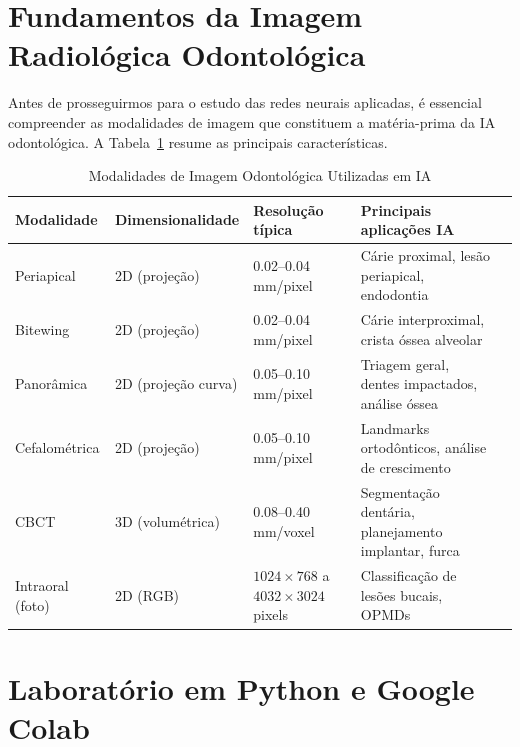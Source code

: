 \section{Fundamentos da Imagem Radiológica Odontológica}

Antes de prosseguirmos para o estudo das redes neurais aplicadas, é essencial compreender as modalidades de imagem que constituem a matéria-prima da IA odontológica. A Tabela~\ref{tab:modalidades-imagem} resume as principais características.

\begin{table}[H]
  \centering
  \caption{Modalidades de Imagem Odontológica Utilizadas em IA}
  \label{tab:modalidades-imagem}
  \begin{tabularx}{\textwidth}{lXXXX}
    \toprule
    \textbf{Modalidade} & \textbf{Dimensionalidade} & \textbf{Resolução típica} & \textbf{Principais aplicações IA} \\
    \midrule
    Periapical & 2D (projeção) & 0.02--0.04 mm/pixel & Cárie proximal, lesão periapical, endodontia \\
    Bitewing & 2D (projeção) & 0.02--0.04 mm/pixel & Cárie interproximal, crista óssea alveolar \\
    Panorâmica & 2D (projeção curva) & 0.05--0.10 mm/pixel & Triagem geral, dentes impactados, análise óssea \\
    Cefalométrica & 2D (projeção) & 0.05--0.10 mm/pixel & Landmarks ortodônticos, análise de crescimento \\
    CBCT & 3D (volumétrica) & 0.08--0.40 mm/voxel & Segmentação dentária, planejamento implantar, furca \\
    Intraoral (foto) & 2D (RGB) & $1024 \times 768$ a $4032 \times 3024$ pixels & Classificação de lesões bucais, OPMDs \\
    \bottomrule
  \end{tabularx}
\end{table}

\section{Laboratório em Python e Google Colab}

